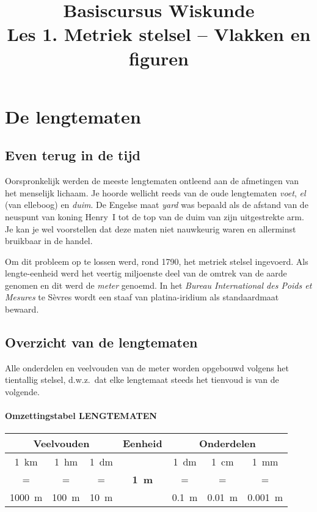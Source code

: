 \documentclass[a4paper,12pt]{article}
\title{Basiscursus Wiskunde\\\large Les 1. Metriek stelsel -- Vlakken en figuren}
\date{}
\author{}
\begin{document}
\maketitle

\section{De lengtematen}

\subsection{Even terug in de tijd}
Oorspronkelijk werden de meeste lengtematen ontleend aan de afmetingen van het menselijk lichaam. Je hoorde wellicht reeds van de oude lengtematen \emph{voet}, \emph{el} (van elleboog) en \emph{duim}. De Engelse maat \emph{yard} was bepaald als de afstand van de neuspunt van koning Henry~I tot de top van de duim van zijn uitgestrekte arm. Je kan je wel voorstellen dat deze maten niet nauwkeurig waren en allerminst bruikbaar in de handel.

Om dit probleem op te lossen werd, rond 1790, het metriek stelsel ingevoerd. Als lengte-eenheid werd het veertig miljoenste deel van de omtrek van de aarde genomen en dit werd de \emph{meter} genoemd. In het \emph{Bureau International des Poids et Mesures} te Sèvres wordt een staaf van platina-iridium als standaardmaat bewaard.

\subsection{Overzicht van de lengtematen}
Alle onderdelen en veelvouden van de meter worden opgebouwd volgens het tientallig stelsel, d.w.z.\ dat elke lengtemaat steeds het tienvoud is van de volgende.

\paragraph{Omzettingstabel LENGTEMATEN}
\renewcommand{\arraystretch}{1.2}
\begin{center}
\setlength{\fboxsep}{4pt}\setlength{\fboxrule}{0.5pt}%
\begin{tabular}{*{7}{c}}
  \multicolumn{3}{c}{\textbf{Veelvouden}} & \textbf{Eenheid} & \multicolumn{3}{c}{\textbf{Onderdelen}}\\
  \midrule
\SI{1}{\kilo\metre} & \SI{1}{\hecto\metre} & \SI{1}{\deca\metre} &  & \SI{1}{\deci\metre} & \SI{1}{\centi\metre} & \SI{1}{\milli\metre}\\
= & = & = & \textbf{\SI{1}{\metre}} & = & = & =\\
\SI{1000}{\metre} & \SI{100}{\metre} & \SI{10}{\metre} & & \SI{0.1}{\metre} & \SI{0.01}{\metre} & \SI{0.001}{\metre}
\end{tabular}%
\end{center}
\end{document}
